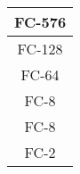 \begin{table}[]
\begin{center}
\begin{tabular}{|c|c|c|c|}
			\multicolumn{4}{|c|}{FC-576}                                                                                                                                                                                                                                                                                                                                         \\ \hline
			\multicolumn{4}{|c|}{FC-128}                                                                                                                                                                                                                                                                                                                                         \\ \hline
			\multicolumn{4}{|c|}{FC-64}                                                                                                                                                                                                                                                                                                                                          \\ \hline
			\multicolumn{4}{|c|}{FC-8}                                                                                                                                                                                                                                                                                                                                           \\ \hline
			\multicolumn{4}{|c|}{FC-8}                                                                                                                                                                                                                                                                                                                                           \\ \hline
			\multicolumn{4}{|c|}{FC-2}                                                                                                                                                                                                                                                                                                                                          \\ \hline
		\end{tabular}
	\end{center}
	\label{table:vgg_archs}
\end{table}

